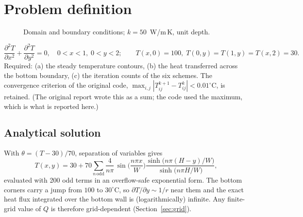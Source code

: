 \section{Problem definition}
\begin{figure}[H]\centering
{}
\caption{Domain and boundary conditions; $k=50$~W/m\,K, unit depth.}\end{figure}
\begin{equation}\frac{\partial^2T}{\partial x^2}+\frac{\partial^2T}{\partial y^2}=0,\quad 0<x<1,\;0<y<2;\qquad T(x,0)=100,\;T(0,y)=T(1,y)=T(x,2)=30. \label{eq:lap}\end{equation}
Required: (a) the steady temperature contours, (b) the heat transferred across the bottom boundary, (c) the iteration counts of the six schemes. The convergence criterion of the original code, $\max_{i,j}|T^{k+1}_{ij}-T^{k}_{ij}|<0.01^\circ$C, is retained. (The original report wrote this as a sum; the code used the maximum, which is what is reported here.)

\subsection{Analytical solution}
With $\theta=(T-30)/70$, separation of variables gives
\begin{equation}
T(x,y)=30+70\sum_{n\,\mathrm{odd}}\frac{4}{n\pi}\,\sin\!\Big(\frac{n\pi x}{W}\Big)\frac{\sinh\!\big(n\pi(H-y)/W\big)}{\sinh\!\big(n\pi H/W\big)}, \label{eq:exact}
\end{equation}
evaluated with 200 odd terms in an overflow-safe exponential form. The bottom corners carry a jump from $100$ to $30^\circ$C, so $\partial T/\partial y\sim1/r$ near them and the exact heat flux integrated over the bottom wall is (logarithmically) infinite. Any finite-grid value of $Q$ is therefore grid-dependent (Section~\ref{sec:grid}).

